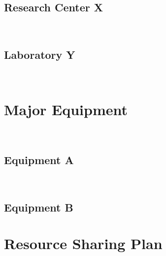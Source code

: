 \subsection*{Research Center X}

\lipsum[8]

~

\subsection*{Laboratory Y}

\lipsum[8]

~

\newpage

\section*{Major Equipment}

~

\subsection*{Equipment A}

\lipsum[55]

~

\subsection*{Equipment B}

\lipsum[55]

\newpage

\section*{Resource Sharing Plan}

